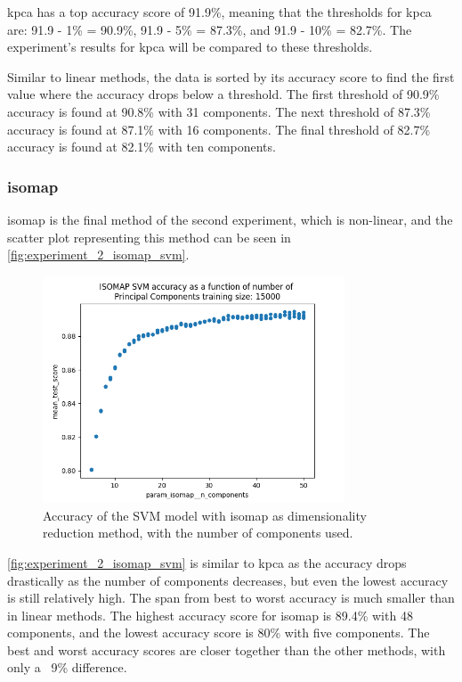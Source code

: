\gls{kpca} has a top accuracy score of 91.9\%, meaning that the thresholds for \gls{kpca} are: 91.9 - 1\% = 90.9\%, 91.9 - 5\% = 87.3\%, and 91.9 - 10\% = 82.7\%. The experiment's results for \gls{kpca} will be compared to these thresholds.

Similar to linear methods, the data is sorted by its accuracy score to find the first value where the accuracy drops below a threshold. The first threshold of 90.9\% accuracy is found at 90.8\% with 31 components. The next threshold of 87.3\% accuracy is found at 87.1\% with 16 components. The final threshold of 82.7\% accuracy is found at 82.1\% with ten components.


\subsubsection{\gls{isomap}}\label{subsubsec:experiment_2_isomap}
\gls{isomap} is the final method of the second experiment, which is non-linear, and the scatter plot representing this method can be seen in \autoref{fig:experiment_2_isomap_svm}.

\begin{figure}[htb!]
    \centering
    \includegraphics[width=0.8\textwidth]{figures/experiment_two/isomap_svm_15000.png}
    \caption{Accuracy of the SVM model with \gls{isomap} as dimensionality reduction method, with the number of components used.}
    \label{fig:experiment_2_isomap_svm}
\end{figure}

\autoref{fig:experiment_2_isomap_svm} is similar to \gls{kpca} as the accuracy drops drastically as the number of components decreases, but even the lowest accuracy is still relatively high. The span from best to worst accuracy is much smaller than in linear methods. The highest accuracy score for \gls{isomap}  is 89.4\% with 48 components, and the lowest accuracy score is 80\% with five components. The best and worst accuracy scores are closer together than the other methods, with only a ~9\% difference.

